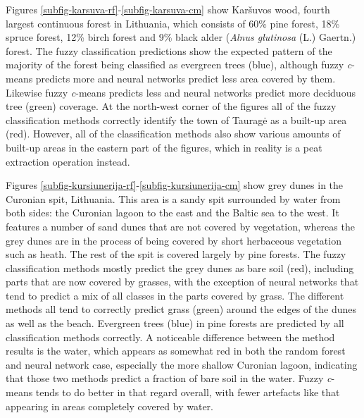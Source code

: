 \documentclass[a4paper,10pt]{book}
\begin{document}
Figures \ref{subfig-karsuva-rf}-\ref{subfig-karsuva-cm} show Kar\v{s}uvos wood, fourth largest continuous forest in Lithuania, which consists of 60\% pine forest, 18\% spruce forest, 12\% birch forest and 9\% black alder (\textit{Alnus glutinosa} (L.) Gaertn.) forest. The fuzzy classification predictions show the expected pattern of the majority of the forest being classified as evergreen trees (blue), although fuzzy \textit{c}-means predicts more and neural networks predict less area covered by them. Likewise fuzzy \textit{c}-means predicts less and neural networks predict more deciduous tree (green) coverage. At the north-west corner of the figures all of the fuzzy classification methods correctly identify the town of Taurag\.{e} as a built-up area (red). However, all of the classification methods also show various amounts of built-up areas in the eastern part of the figures, which in reality is a peat extraction operation instead.

Figures \ref{subfig-kursiunerija-rf}-\ref{subfig-kursiunerija-cm} show grey dunes in the Curonian spit, Lithuania. This area is a sandy spit surrounded by water from both sides: the Curonian lagoon to the east and the Baltic sea to the west. It features a number of sand dunes that are not covered by vegetation, whereas the grey dunes are in the process of being covered by short herbaceous vegetation such as heath. The rest of the spit is covered largely by pine forests. The fuzzy classification methods mostly predict the grey dunes as bare soil (red), including parts that are now covered by grasses, with the exception of neural networks that tend to predict a mix of all classes in the parts covered by grass. The different methods all tend to correctly predict grass (green) around the edges of the dunes as well as the beach. Evergreen trees (blue) in pine forests are predicted by all classification methods correctly. A noticeable difference between the method results is the water, which appears as somewhat red in both the random forest and neural network case, especially the more shallow Curonian lagoon, indicating that those two methods predict a fraction of bare soil in the water. Fuzzy \textit{c}-means tends to do better in that regard overall, with fewer artefacts like that appearing in areas completely covered by water.
\end{document}
